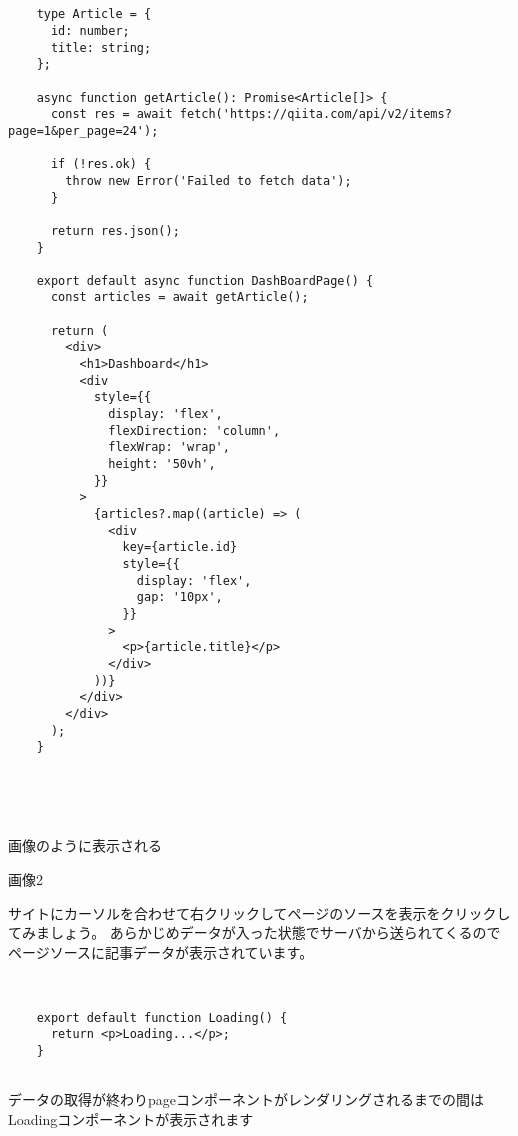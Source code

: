 \begin{tcolorbox}[breakable]
  \begin{verbatim}


    type Article = {
      id: number;
      title: string;
    };
    
    async function getArticle(): Promise<Article[]> {
      const res = await fetch('https://qiita.com/api/v2/items?page=1&per_page=24');
    
      if (!res.ok) {
        throw new Error('Failed to fetch data');
      }
    
      return res.json();
    }
    
    export default async function DashBoardPage() {
      const articles = await getArticle();
    
      return (
        <div>
          <h1>Dashboard</h1>
          <div
            style={{
              display: 'flex',
              flexDirection: 'column',
              flexWrap: 'wrap',
              height: '50vh',
            }}
          >
            {articles?.map((article) => (
              <div
                key={article.id}
                style={{
                  display: 'flex',
                  gap: '10px',
                }}
              >
                <p>{article.title}</p>
              </div>
            ))}
          </div>
        </div>
      );
    }
    
    
      
      
        \end{verbatim}
\end{tcolorbox}



画像のように表示される

画像2


サイトにカーソルを合わせて右クリックしてページのソースを表示をクリックしてみましょう。
あらかじめデータが入った状態でサーバから送られてくるのでページソースに記事データが表示されています。



\begin{tcolorbox}[breakable]
  \begin{verbatim}


    export default function Loading() {
      return <p>Loading...</p>;
    }
    
  \end{verbatim}
\end{tcolorbox}


データの取得が終わりpageコンポーネントがレンダリングされるまでの間はLoadingコンポーネントが表示されます




